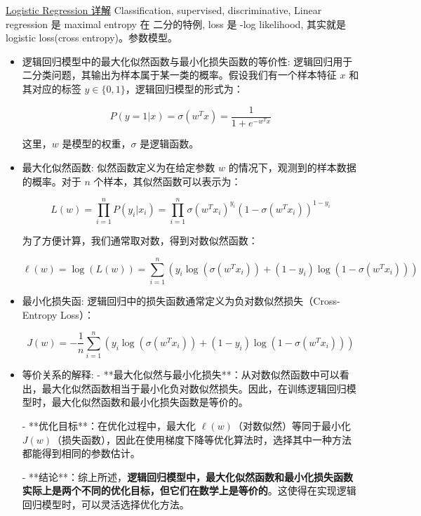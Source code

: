 \documentclass[12pt]{article}
\numberwithin{theorem}{section} %
\numberwithin{definition}{section} %
\numberwithin{assumption}{section} %
\numberwithin{lemma}{section} %
\numberwithin{remark}{section} %
\numberwithin{prop}{section} %
\numberwithin{corollary}{section} %
\numberwithin{example}{section} %
\numberwithin{question}{section} %
\numberwithin{problem}{section} %
\numberwithin{conjecture}{section} %
\numberwithin{append}{section} %
\numberwithin{property}{section} %
\begin{document}
\begin{CJK}{UTF8}{gbsn}
	\href{https://zhuanlan.zhihu.com/p/74874291}{Logistic Regression 详解} 
	Classification, supervised, discriminative, Linear regression 是 maximal entropy 在 二分的特例, loss 是 -log likelihood, 其实就是 logistic loss(cross entropy)。参数模型。
	\begin{itemize}
		\item 逻辑回归模型中的最大化似然函数与最小化损失函数的等价性: 逻辑回归用于二分类问题，其输出为样本属于某一类的概率。假设我们有一个样本特征 $ x $ 和其对应的标签 $ y \in \{0, 1\} $，逻辑回归模型的形式为：
		
		\begin{equation}
			P(y=1|x) = \sigma(w^T x) = \frac{1}{1 + e^{-w^T x}}
		\end{equation}
		
		这里，$ w $ 是模型的权重，$ \sigma $ 是逻辑函数。
		\item 最大化似然函数: 似然函数定义为在给定参数 $ w $ 的情况下，观测到的样本数据的概率。对于 $ n $ 个样本，其似然函数可以表示为：
		
		\begin{equation}
			L(w) = \prod_{i=1}^{n} P(y_i|x_i) = \prod_{i=1}^{n} \sigma(w^T x_i)^{y_i} (1 - \sigma(w^T x_i))^{1 - y_i}
		\end{equation}
		
		为了方便计算，我们通常取对数，得到对数似然函数：
		
		\begin{equation}
			\ell(w) = \log(L(w)) = \sum_{i=1}^{n} \left( y_i \log(\sigma(w^T x_i)) + (1 - y_i) \log(1 - \sigma(w^T x_i)) \right)
		\end{equation}
		\item 最小化损失函: 逻辑回归中的损失函数通常定义为负对数似然损失（Cross-Entropy Loss）：
		
		\begin{equation}
			J(w) = -\frac{1}{n} \sum_{i=1}^{n} \left( y_i \log(\sigma(w^T x_i)) + (1 - y_i) \log(1 - \sigma(w^T x_i)) \right)
		\end{equation}
		\item 等价关系的解释: 
		- **最大化似然与最小化损失**：从对数似然函数中可以看出，最大化似然函数相当于最小化负对数似然损失。因此，在训练逻辑回归模型时，最大化似然函数和最小化损失函数是等价的。
		
		- **优化目标**：在优化过程中，最大化 $ \ell(w) $（对数似然）等同于最小化 $ J(w) $（损失函数），因此在使用梯度下降等优化算法时，选择其中一种方法都能得到相同的参数估计。
		
		- **结论**：综上所述，\textbf{逻辑回归模型中，最大化似然函数和最小化损失函数实际上是两个不同的优化目标，但它们在数学上是等价的}。这使得在实现逻辑回归模型时，可以灵活选择优化方法。
	\end{itemize}
		

\end{CJK}
\end{document}
